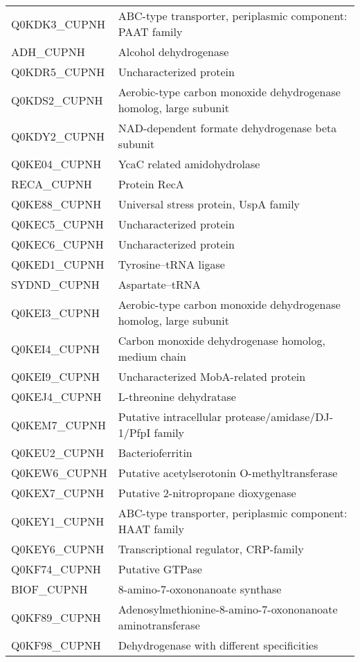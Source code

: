 \begin{center}
\begin{longtable}{ l l }
Q0KDK3\_CUPNH & ABC-type transporter, periplasmic component: PAAT family \\ [0.5ex]
ADH\_CUPNH & Alcohol dehydrogenase \\ [0.5ex]
Q0KDR5\_CUPNH & Uncharacterized protein \\ [0.5ex]
Q0KDS2\_CUPNH & Aerobic-type carbon monoxide dehydrogenase homolog, large subunit \\ [0.5ex]
Q0KDY2\_CUPNH & NAD-dependent formate dehydrogenase beta subunit \\ [0.5ex]
Q0KE04\_CUPNH & YcaC related amidohydrolase \\ [0.5ex]
RECA\_CUPNH & Protein RecA \\ [0.5ex]
Q0KE88\_CUPNH & Universal stress protein, UspA family \\ [0.5ex]
Q0KEC5\_CUPNH & Uncharacterized protein \\ [0.5ex]
Q0KEC6\_CUPNH & Uncharacterized protein \\ [0.5ex]
Q0KED1\_CUPNH & Tyrosine--tRNA ligase \\ [0.5ex]
SYDND\_CUPNH & Aspartate--tRNA \\ [0.5ex]
Q0KEI3\_CUPNH & Aerobic-type carbon monoxide dehydrogenase homolog, large subunit \\ [0.5ex]
Q0KEI4\_CUPNH & Carbon monoxide dehydrogenase homolog, medium chain \\ [0.5ex]
Q0KEI9\_CUPNH & Uncharacterized MobA-related protein \\ [0.5ex]
Q0KEJ4\_CUPNH & L-threonine dehydratase \\ [0.5ex]
Q0KEM7\_CUPNH & Putative intracellular protease/amidase/DJ-1/PfpI family \\ [0.5ex]
Q0KEU2\_CUPNH & Bacterioferritin \\ [0.5ex]
Q0KEW6\_CUPNH & Putative acetylserotonin O-methyltransferase \\ [0.5ex]
Q0KEX7\_CUPNH & Putative 2-nitropropane dioxygenase \\ [0.5ex]
Q0KEY1\_CUPNH & ABC-type transporter, periplasmic component: HAAT family \\ [0.5ex]
Q0KEY6\_CUPNH & Transcriptional regulator, CRP-family \\ [0.5ex]
Q0KF74\_CUPNH & Putative GTPase \\ [0.5ex]
BIOF\_CUPNH & 8-amino-7-oxononanoate synthase \\ [0.5ex]
Q0KF89\_CUPNH & Adenosylmethionine-8-amino-7-oxononanoate aminotransferase \\ [0.5ex]
Q0KF98\_CUPNH & Dehydrogenase with different specificities \\ [0.5ex]

\end{longtable}
\end{center}
